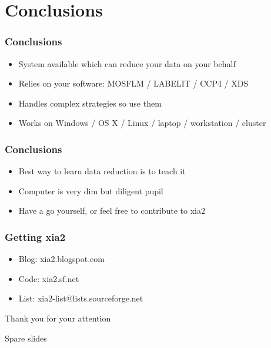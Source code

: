 \documentclass[slides,compress]{beamer}
\begin{document}
\section{Conclusions}

\begin{frame}
\frametitle{Conclusions}
\begin{itemize}
\item{System available which can reduce your data on your behalf}
\item{Relies on your software: MOSFLM / LABELIT / CCP4 / XDS}
\item{Handles complex strategies so use them}
\item{Works on Windows / OS X / Linux / laptop / workstation / cluster}
\end{itemize}
\end{frame}

\begin{frame}
\frametitle{Conclusions}
\begin{itemize}
\item{Best way to learn data reduction is to teach it}
\item{Computer is very dim but diligent pupil}
\item{Have a go yourself, or feel free to contribute to xia2}
\end{itemize}
\end{frame}

\begin{frame}
\frametitle{Getting xia2}
\begin{itemize}
\item{Blog: xia2.blogspot.com}
\item{Code: xia2.sf.net}
\item{List: xia2-list@lists.sourceforge.net}
\end{itemize}
\end{frame}

\begin{frame}
\begin{center}
\Huge Thank you for your attention
\end{center}
\end{frame}

\begin{frame}
\begin{center}
\Huge Spare slides
\end{center}
\end{frame}
\end{document}
